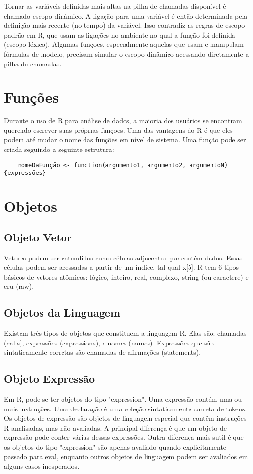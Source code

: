      Tornar as variáveis definidas mais altas na pilha de chamadas disponível é chamado escopo dinâmico. A ligação para uma variável é então determinada pela definição mais recente (no tempo) da variável. Isso contradiz as regras de escopo padrão em R, que usam as ligações no ambiente no qual a função foi definida (escopo léxico). Algumas funções, especialmente aquelas que usam e manipulam fórmulas de modelo, precisam simular o escopo dinâmico acessando diretamente a pilha de chamadas.
      
  \section{Funções}
    Durante o uso de R para análise de dados, a maioria dos usuários se encontram querendo escrever suas próprias funções. Uma das vantagens do R é que eles podem até mudar o nome das funções em nível de sistema. Uma função pode ser criada seguindo a seguinte estrutura:
		
		\color{blue}
		\begin{verbatim}
    nomeDaFunção <- function(argumento1, argumento2, argumentoN) {expressões}

\end{verbatim}
\color{black}
  
  \section{Objetos}    
    \subsection{Objeto Vetor}
      Vetores podem ser entendidos como células adjacentes que contém dados. Essas células podem ser acessadas a partir de um índice, tal qual x[5]. R tem 6 tipos básicos de vetores atômicos: lógico, inteiro, real, complexo, string (ou caractere) e cru (raw).
    
    \subsection{Objetos da Linguagem}
      Existem três tipos de objetos que constituem a linguagem R. Elas são: chamadas (calls), expressões (expressions), e nomes (names). Expressões que são sintaticamente corretas são chamadas de afirmações (statements).
    
    \subsection{Objeto Expressão}
      Em R, pode-se ter objetos do tipo "expression". Uma expressão contém uma ou mais instruções. Uma declaração é uma coleção sintaticamente correta de tokens. Os objetos de expressão são objetos de linguagem especial que contêm instruções R analisadas, mas não avaliadas. A principal diferença é que um objeto de expressão pode conter várias dessas expressões. Outra diferença mais sutil é que os objetos do tipo "expression" são apenas avaliado quando explicitamente passado para eval, enquanto outros objetos de linguagem podem ser avaliados em alguns casos inesperados.
      
